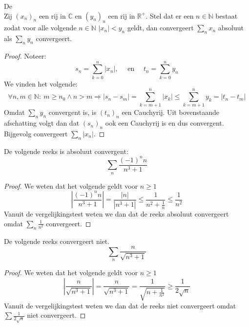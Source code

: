 \documentclass[main.tex]{subfiles}
\begin{document}
\begin{bst}
  \label{st:vergelijkingstest}
  De \\
  Zij $(x_{n})_{n}$ een rij in $\mathbb{C}$ en $(y_{n})_{n}$ een rij in $\mathbb{R}^{+}$.
  Stel dat er een $n\in \mathbb{N}$ bestaat zodat voor alle volgende $n\in \mathbb{N}$ $|x_{n}| < y_{n}$ geldt, dan convergeert $\sum_{n}x_{n}$ absoluut als $\sum_{n}y_{n}$ convergeert.

  \begin{proof}
    Noteer:
    \[ 
    s_{n} = \sum_{k=0}^{n}|x_{n}|,\quad
    \text{ en }\quad
    t_{n} = \sum_{k=0}^{n}y_{n}
    \]
    We vinden het volgende:
    \[ \forall n,m\in \mathbb{N}:\ m \ge n_{0} \wedge n > m \Rightarrow |s_{n}-s_{m}| = \sum_{k=m+1}^{n}|x_{k}| \le \sum_{k=m+1}^{n}y_{k} = |t_{n}-t_{m}| \]
    Omdat $\sum_{n}y_{n}$ convergent is, is $(t_{n})_{n}$ een Cauchyrij.
    Uit bovenstaande afschatting volgt dan dat $(s_{n})_{n}$ ook een Cauchyrij is en dus convergent.
    Bijgevolg convergeert $\sum_{n}|x_{n}|$.
  \end{proof}
\end{bst}

\begin{vb}
  De volgende reeks is absoluut convergent:
  \[ \sum_{n}\frac{(-1)^{n}n}{n^{3}+1} \]
  
  \begin{proof}
    We weten dat het volgende geldt voor $n\ge 1$
    \[
    \left| \frac{(-1)^{n}n}{n^{3}+1} \right|
    = \frac{|n|}{|n^{3}+1|}
    \le \frac{1}{n^{2}+ \frac{1}{n}}
    \le \frac{1}{n^{2}} \]
    Vanuit de vergelijkingstest weten we dan dat de reeks absoluut convergeert omdat $\sum_{n}\frac{1}{n^{2}}$ convergeert.
  \end{proof}
\end{vb}

\begin{vb}
  De volgende reeks convergeert niet.
  \[ \sum_{n}\frac{n}{\sqrt{n^{3}+1}} \]

  \begin{proof}
    We weten dat het volgende geldt voor $n\ge 1$
    \[
    \left| \frac{n}{\sqrt{n^{3}+1}}\right|
    = \frac{n}{\sqrt{n^{3}+1}}
    = \frac{1}{\sqrt{n + \frac{1}{n^{2}}}}
    \ge \frac{1}{2\sqrt{n}}
    \]
    Vanuit de vergelijkingstest weten we dan dat de reeks niet convergeert omdat $\sum\frac{1}{2\sqrt{n}}$ niet convergeert.
  \end{proof}
\end{vb}
\end{document}
